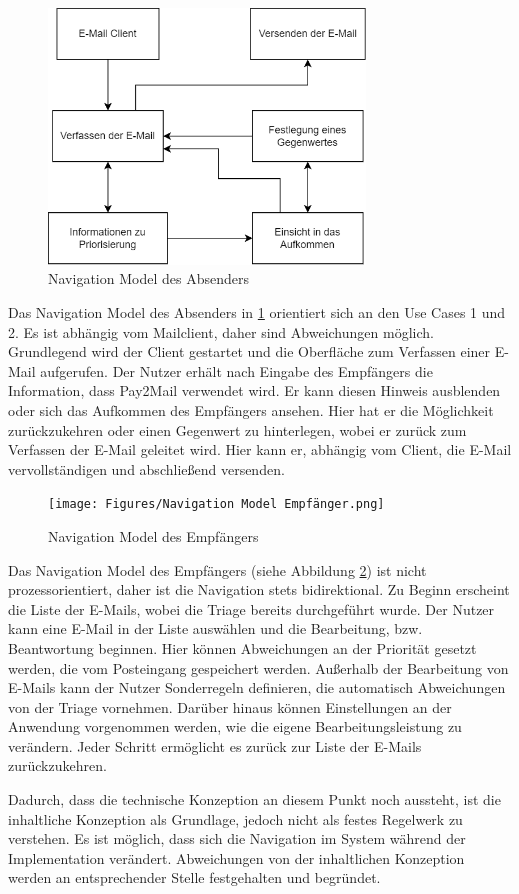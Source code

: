 \begin{figure}[!ht]
	\centering
		\includegraphics[width=0.75\textwidth]{Figures/Navigation Model Absender.png}
	\caption{Navigation Model des Absenders}
	\label{fig:navigation_model_absender}
\end{figure}

\noindent Das Navigation Model des Absenders in \ref{fig:navigation_model_absender} orientiert sich an den Use Cases 1 und 2. Es ist abhängig vom Mailclient, daher sind Abweichungen möglich. Grundlegend wird der Client gestartet und die Oberfläche zum Verfassen einer E-Mail aufgerufen. Der Nutzer erhält nach Eingabe des Empfängers die Information, dass Pay2Mail verwendet wird. Er kann diesen Hinweis ausblenden oder sich das Aufkommen des Empfängers ansehen. Hier hat er die Möglichkeit zurückzukehren oder einen Gegenwert zu hinterlegen, wobei er zurück zum Verfassen der E-Mail geleitet wird. Hier kann er, abhängig vom Client, die E-Mail vervollständigen und abschließend versenden.

\begin{figure}[!ht]
	\centering
		\texttt{[image: Figures/Navigation Model Empfänger.png]}
	\caption{Navigation Model des Empfängers}
	\label{fig:navigation_model_empfaenger}
\end{figure}

Das Navigation Model des Empfängers (siehe Abbildung \ref{fig:navigation_model_empfaenger}) ist nicht prozessorientiert, daher ist die Navigation stets bidirektional. Zu Beginn erscheint die Liste der E-Mails, wobei die Triage bereits durchgeführt wurde. Der Nutzer kann eine E-Mail in der Liste auswählen und die Bearbeitung, bzw. Beantwortung beginnen. Hier können Abweichungen an der Priorität gesetzt werden, die vom Posteingang gespeichert werden. Außerhalb der Bearbeitung von E-Mails kann der Nutzer Sonderregeln definieren, die automatisch Abweichungen von der Triage vornehmen. Darüber hinaus können Einstellungen an der Anwendung vorgenommen werden, wie die eigene Bearbeitungsleistung zu verändern. Jeder Schritt ermöglicht es zurück zur Liste der E-Mails zurückzukehren.

Dadurch, dass die technische Konzeption an diesem Punkt noch aussteht, ist die inhaltliche Konzeption als Grundlage, jedoch nicht als festes Regelwerk zu verstehen. Es ist möglich, dass sich die Navigation im System während der Implementation verändert. Abweichungen von der inhaltlichen Konzeption werden an entsprechender Stelle festgehalten und begründet.